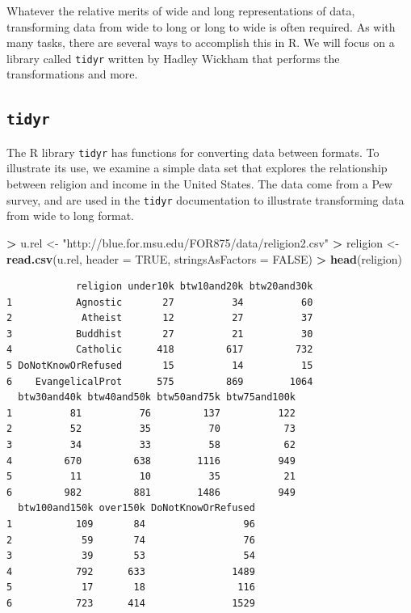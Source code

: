 \documentclass[]{krantz}
\makeatletter
\newenvironment{Shaded}{\begin{snugshade}}{\end{snugshade}}
\newcommand{\DataTypeTok}[1]{\textcolor[rgb]{0.27,0.27,0.27}{#1}}
\newcommand{\KeywordTok}[1]{\textcolor[rgb]{0.27,0.27,0.27}{\textbf{#1}}}
\newcommand{\NormalTok}[1]{#1}
\newcommand{\OperatorTok}[1]{\textcolor[rgb]{0.43,0.43,0.43}{\textbf{#1}}}
\newcommand{\OtherTok}[1]{\textcolor[rgb]{0.37,0.37,0.37}{#1}}
\newcommand{\StringTok}[1]{\textcolor[rgb]{0.5,0.5,0.5}{#1}}
\newenvironment{kframe}{%
\medskip{}
\setlength{\fboxsep}{.8em}
 \def\at@end@of@kframe{}%
 \ifinner\ifhmode%
  \def\at@end@of@kframe{\end{minipage}}%
  \begin{minipage}{\columnwidth}%
 \fi\fi%
 \def\FrameCommand##1{\hskip\@totalleftmargin \hskip-\fboxsep
 \colorbox{shadecolor}{##1}\hskip-\fboxsep
     \hskip-\linewidth \hskip-\@totalleftmargin \hskip\columnwidth}%
 \MakeFramed {\advance\hsize-\width
   \@totalleftmargin\z@ \linewidth\hsize
   \@setminipage}}%
 {\par\unskip\endMakeFramed%
 \at@end@of@kframe}
\renewenvironment{Shaded}{\begin{kframe}}{\end{kframe}}
\makeatother
\begin{document}
Whatever the relative merits of wide and long representations of data, transforming data from wide to long or long to wide is often required. As with many tasks, there are several ways to accomplish this in R. We will focus on a library called \texttt{tidyr} written by Hadley Wickham that performs the transformations and more.

\hypertarget{tidyr}{%
\subsection{\texorpdfstring{\texttt{tidyr}}{tidyr}}\label{tidyr}}

The R library \texttt{tidyr} has functions for converting data between formats. To illustrate its use, we examine a simple data set that explores the relationship between religion and income in the United States. The data come from a Pew survey, and are used in the \texttt{tidyr} documentation to illustrate transforming data from wide to long format.

\begin{Shaded}
\begin{Highlighting}[]
\OperatorTok{>}\StringTok{ }\NormalTok{u.rel <-}\StringTok{ "http://blue.for.msu.edu/FOR875/data/religion2.csv"}
\OperatorTok{>}\StringTok{ }\NormalTok{religion <-}\StringTok{ }\KeywordTok{read.csv}\NormalTok{(u.rel, }\DataTypeTok{header =} \OtherTok{TRUE}\NormalTok{, }\DataTypeTok{stringsAsFactors =} \OtherTok{FALSE}\NormalTok{)}
\OperatorTok{>}\StringTok{ }\KeywordTok{head}\NormalTok{(religion)}
\end{Highlighting}
\end{Shaded}

\begin{verbatim}
            religion under10k btw10and20k btw20and30k
1           Agnostic       27          34          60
2            Atheist       12          27          37
3           Buddhist       27          21          30
4           Catholic      418         617         732
5 DoNotKnowOrRefused       15          14          15
6    EvangelicalProt      575         869        1064
  btw30and40k btw40and50k btw50and75k btw75and100k
1          81          76         137          122
2          52          35          70           73
3          34          33          58           62
4         670         638        1116          949
5          11          10          35           21
6         982         881        1486          949
  btw100and150k over150k DoNotKnowOrRefused
1           109       84                 96
2            59       74                 76
3            39       53                 54
4           792      633               1489
5            17       18                116
6           723      414               1529
\end{verbatim}
\end{document}
